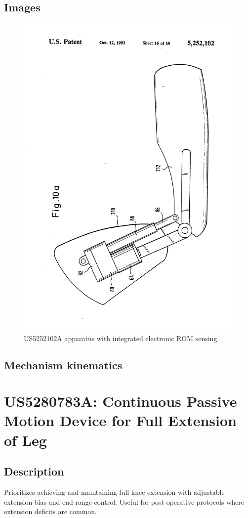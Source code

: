 \documentclass[11pt]{article}
\begin{document}
\subsection{Images}
\begin{figure}[H]
  \centering
  \includegraphics[width=0.54\linewidth, angle=-90]{US5252102_1.png}
  \caption{US5252102A apparatus with integrated electronic ROM sensing.}
  \label{fig:US5252102A}
\end{figure}

\subsection{Mechanism kinematics}

\section{US5280783A: Continuous Passive Motion Device for Full Extension of Leg}
\subsection{Description}
Prioritizes achieving and maintaining full knee extension with adjustable extension bias and end-range control. Useful for post-operative protocols where extension deficits are common.
\end{document}
